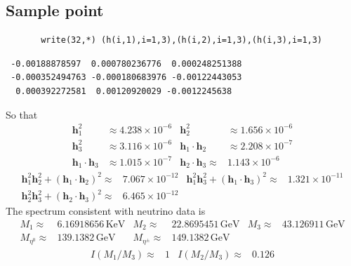 
\begin{subappendices} %
  

\section{Sample point}
\label{sec:sample-point}

\begin{verbatim} 
       write(32,*) (h(i,1),i=1,3),(h(i,2),i=1,3),(h(i,3),i=1,3)
\end{verbatim} %

\begin{verbatim} 
 -0.00188878597  0.000780236776  0.000248251388 
 -0.000352494763 -0.000180683976 -0.00122443053  
  0.000392272581  0.00120920029 -0.0012245638
\end{verbatim} %

So that
\begin{align}
  \mathbf{h}_1^2&\approx4.238\times10^{-6}&\mathbf{h}_2^2&\approx1.656\times10^{-6}\nonumber\\
  \mathbf{h}_3^2&\approx3.116\times10^{-6} & \mathbf{h}_1\cdot\mathbf{h}_2&\approx2.208\times10^{-7}\nonumber\\
\mathbf{h}_1\cdot\mathbf{h}_3&\approx1.015\times10^{-7}& \mathbf{h}_2\cdot\mathbf{h}_3\approx&1.143\times10^{-6}
\end{align}
\begin{align}
  \mathbf{h}_1^2\mathbf{h}_2^2+(\mathbf{h}_1\cdot\mathbf{h}_2)^2\approx&7.067\times10^{-12}
  &\mathbf{h}_1^2\mathbf{h}_3^2+(\mathbf{h}_1\cdot\mathbf{h}_3)^2\approx&1.321\times10^{-11}\nonumber\\
  \mathbf{h}_2^2\mathbf{h}_3^2+(\mathbf{h}_2\cdot\mathbf{h}_3)^2\approx&6.465\times10^{-12}
\end{align}
The spectrum consistent with neutrino data is
\begin{align}
  M_1\approx&6.16918656\,\text{KeV} &M_2\approx&22.8695451\,\text{GeV}  &M_3\approx&43.126911\,\text{GeV}\nonumber\\
  M_{\eta^0}\approx&139.1382\,\text{GeV}& M_{\eta^\pm}\approx&149.1382\,\text{GeV}
\end{align}
\begin{align}
  I(M_1/M_3)\approx&1 & I(M_2/M_3)\approx&0.126
\end{align}


\end{subappendices}
